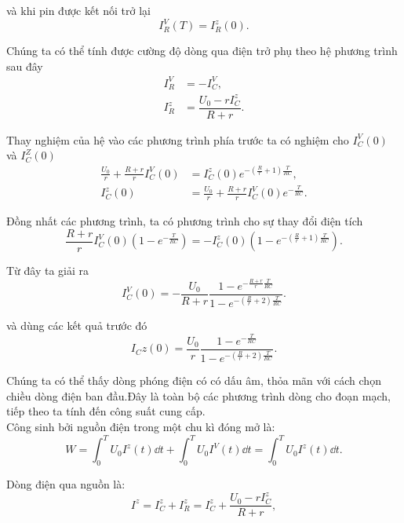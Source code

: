 \begin{loigiai}
và khi pin được kết nối trở lại
    \[I_{R}^{V}(T) = I_{R}^{z}(0) . \]

Chúng ta có thể tính được cường độ dòng qua điện trở phụ theo hệ phương trình sau đây
  \[ \begin{aligned}  I_{R}^{V} & = - I_{C}^{V}, \\
          I_{R}^{z} &= \dfrac{U_0 - rI_{C}^{z} }{R+ r} . \end{aligned} \]

Thay nghiệm của hệ vào các phương trình phía trước ta có nghiệm cho $I_{C}^{V}(0)$ và $I_{C}^{Z}(0)$ 
  \[  \begin{aligned} \frac{U_0}{r} + \frac{R+r}{r} I_{C}^{V}(0) &= I_{C}^{z} (0) e^{-(\frac{R}{r} +1) \frac{T}{RC}} , \\
    I_{C}^{z}(0) &= \frac{U_0}{r} + \frac{R+r}{r}I_{C}^{V} (0) e^{-\frac{T}{RC}}. \end{aligned}\]

Đồng nhất các phương trình, ta có phương trình cho sự thay đổi điện tích
   \[\frac{R+r}{r}I_{C}^{V} (0) \left(1- e^{-\frac{T}{RC}}\right) = - I_{C}^{z} (0) \left( 1 - e^{-(\frac{R}{r} +1) \frac{T}{RC}}\right) .\]

Từ đây ta giải ra
 \[ I_{C}^{V}(0) = - \frac{U_0}{R+r} \dfrac{1 - e^{-\frac{R+r}{r}\frac{T}{RC}} }{1 - e^{- (\frac{R}{r} +2 ) \frac{T}{RC}} }. \]

và dùng các kết quả trước đó
   \[I_{C}{z} (0) = \frac{U_0}{r} \frac{1- e^{-\frac{T}{RC} }}{1 - e^{-(\frac{R}{r} +2)\frac{T}{RC}}} .\]

Chúng ta có thể thấy dòng phóng điện có có dấu âm, thỏa mãn với cách chọn chiều dòng điện ban đầu.Đây là toàn bộ các phương trình dòng cho đoạn mạch, tiếp theo ta tính đến công suất cung cấp. \\
Công sinh bởi nguồn điện trong một chu kì đóng mở là:
  \[ W =\int_{0}^{T} U_0 I^{z} (t) \dd t + \int_{0}^{T} U_0 I^{V}(t) \dd t = \int_{0}^{T} U_0 I^{z} (t) \dd t. \]

Dòng điện qua nguồn là:
   \[ I^{z} = I_{C}^{z} + I_{R}^{z} = I_{C}^{z} + \frac{U_0 - r I_{C}^{z}}{R+r} , \]


\end{loigiai}

